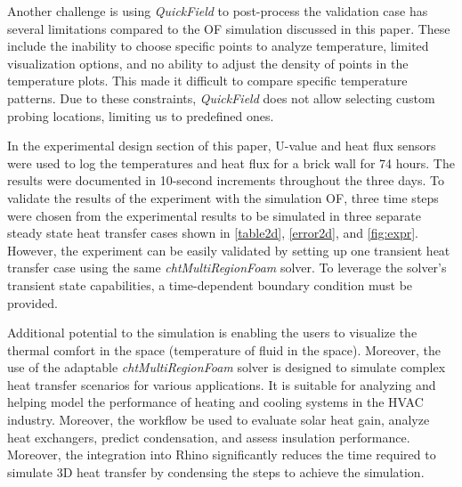 Another challenge is using \textit{QuickField} to post-process the validation case has several limitations compared to the \gls{OF} simulation discussed in this paper. These include the inability to choose specific points to analyze temperature, limited visualization options, and no ability to adjust the density of points in the temperature plots. This made it difficult to compare specific temperature patterns.
Due to these constraints, \textit{QuickField} does not allow selecting custom probing locations, limiting us to predefined ones.




In the experimental design section of this paper, U-value and heat flux sensors were used to log the temperatures and heat flux for a brick wall for 74 hours. The results were documented in 10-second increments throughout the three days. To validate the results of the experiment with the simulation \gls{OF}, three time steps were chosen from the experimental results to be simulated in three separate steady state heat transfer cases shown in \ref{table2d}, \ref{error2d}, and \ref{fig:expr}. However, the experiment can be easily validated by setting up one transient heat transfer case using the same \textit{chtMultiRegionFoam} solver. To leverage the solver's transient state capabilities, a time-dependent boundary condition must be provided. 



Additional potential to the simulation is enabling the users to visualize the thermal comfort in the space (temperature of fluid in the space). Moreover, the use of the adaptable \textit{chtMultiRegionFoam} solver is designed to simulate complex heat transfer scenarios for various applications. It is suitable for analyzing and helping model the performance of heating and cooling systems in the HVAC  industry. Moreover, the workflow be used to evaluate solar heat gain, analyze heat exchangers, predict condensation, and assess insulation performance. Moreover, the integration into
Rhino significantly reduces the time required to simulate 3D heat transfer by condensing the steps to achieve the simulation.



